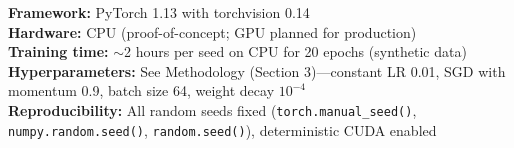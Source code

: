\textbf{Framework:} PyTorch 1.13 with torchvision 0.14 \\
\textbf{Hardware:} CPU (proof-of-concept; GPU planned for production) \\
\textbf{Training time:} $\sim$2 hours per seed on CPU for 20 epochs (synthetic data) \\
\textbf{Hyperparameters:} See Methodology (Section 3)---constant LR 0.01, SGD with momentum 0.9, batch size 64, weight decay $10^{-4}$ \\
\textbf{Reproducibility:} All random seeds fixed (\texttt{torch.manual\_seed()}, \texttt{numpy.random.seed()}, \texttt{random.seed()}), deterministic CUDA enabled
